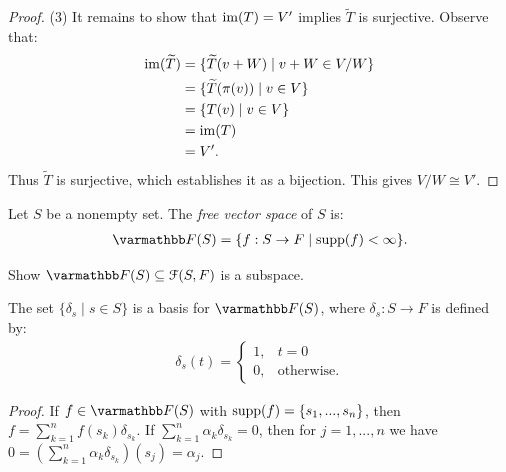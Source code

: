 \begin{proof}
            (3) It remains to show that $\operatorname{im}(T) = V'$ implies $\widetilde{T}$ is surjective. Observe that:
                \begin{equation*}
                \begin{split}
                    \operatorname{im}(\widetilde{T})
                    & = \{\widetilde{T}(v+W) \mid v+W \in V/W \} \\
                    & = \{\widetilde{T}(\pi(v)) \mid v \in V \} \\
                    & = \{T(v) \mid v \in V\} \\
                    & = \operatorname{im}(T) \\
                    & = V'.
                \end{split}
                \end{equation*}
            Thus $\widetilde{T}$ is surjective, which establishes it as a bijection. This gives $V/W \cong V'$.
        \end{proof}

    \begin{definition}
        Let $S$ be a nonempty set. The \textit{free vector space} of $S$ is:
            \begin{equation*}
            \begin{split}
                \bfF(S) = \{f:S \rightarrow F \mid \supp(f) <\infty \}.
            \end{split}
            \end{equation*}
    \end{definition}

    \begin{exercise}
        Show $\bfF(S) \subseteq \cF(S,F)$ is a subspace.
    \end{exercise}

    \begin{proposition}
        The set $\{\delta_s \mid s \in S\}$ is a basis for $\bfF(S)$, where $\delta_s :S \rightarrow F$ is defined by:
            \begin{equation*}
            \begin{split}
                \delta_s(t) = \begin{cases}1, & t =0 \\ 0, & \text{otherwise.} \end{cases}
            \end{split}
            \end{equation*}
    \end{proposition}
        \begin{proof}
            If $f \in \bfF(S)$ with $\operatorname{supp}(f) = \{s_1,...,s_n\}$, then $f = \sum_{k =1}^n f(s_k)\delta_{s_k}$. If \newline$\sum_{k = 1}^n \alpha_k \delta_{s_k} = 0$, then for $j = 1,...,n$ we have $0 = \left( \sum_{k  =1}^n \alpha_k \delta_{s_k} \right)(s_j) = \alpha_j$.
        \end{proof}

